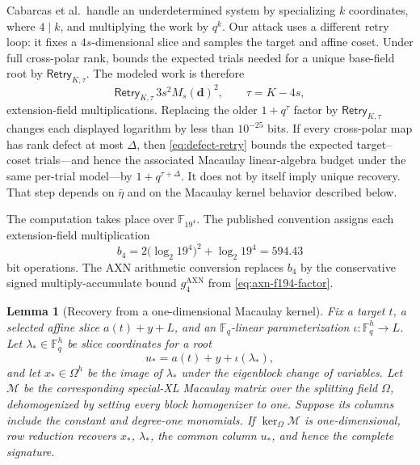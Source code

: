 \documentclass[11pt]{article}
\newtheorem{lemma}[lemma]{Lemma}
\newcommand{\F}{\mathbb F}
\begin{document}
Cabarcas et al.\ handle an underdetermined system by specializing $k$
coordinates, where $4\mid k$, and multiplying the work by $q^k$.  Our attack
uses a different retry loop: it fixes a $4s$-dimensional slice and samples the
target and affine coset.  Under full cross-polar rank,
 bounds the expected trials needed for a unique
base-field root by $\mathsf{Retry}_{K,\tau}$.  The modeled work is therefore
\begin{equation}\label{eq:special-xl-cost}
 \mathsf{Retry}_{K,\tau}\,3s^2M_s(\mathbf d)^2,
 \qquad \tau=K-4s,
\end{equation}
extension-field multiplications.  Replacing the older $1+q^\tau$ factor by
$\mathsf{Retry}_{K,\tau}$ changes each displayed logarithm by less than $10^{-25}$ bits.
If every cross-polar map has rank defect at most $\Delta$, then
\eqref{eq:defect-retry} bounds the expected target--coset trials---and hence
the associated Macaulay linear-algebra budget under the same per-trial
model---by $1+q^{\tau+\Delta}$.  It does not by itself imply unique
recovery.  That step depends on $\bar\eta$ and
on the Macaulay kernel behavior described below.

The computation takes place over $\F_{19^4}$.  The published convention assigns
each extension-field multiplication
\begin{equation}\label{eq:bitop-conversion}
 b_4=2\bigl(\log_2 19^4\bigr)^2+\log_2 19^4=594.43
\end{equation}
bit operations.  The AXN arithmetic conversion replaces $b_4$ by the conservative
signed multiply-accumulate bound $g_4^{\mathrm{AXN}}$ from
\eqref{eq:axn-f194-factor}.

\begin{lemma}[Recovery from a one-dimensional Macaulay kernel]\label{lem:macaulay-recovery}
Fix a target $t$, a selected affine slice $a(t)+y+L$, and an
$\F_q$-linear parameterization $\iota:\F_q^h\to L$.  Let $\lambda_*\in\F_q^h$ be slice coordinates for a
root
\[
  u_*=a(t)+y+\iota(\lambda_*),
\]
and let $x_*\in\Omega^h$ be the image of $\lambda_*$ under the eigenblock
change of variables.  Let $\mathcal M$ be the corresponding special-XL
Macaulay matrix over the splitting field $\Omega$, dehomogenized by setting
every block homogenizer to one.  Suppose its columns include the constant and
degree-one monomials.  If $\ker_\Omega\mathcal M$ is one-dimensional, row
reduction recovers $x_*$, $\lambda_*$, the common column $u_*$, and hence the
complete signature.
\end{lemma}
\end{document}

